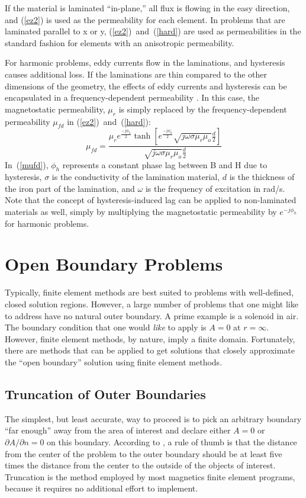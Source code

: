 \documentclass[12pt]{report}
\newcommand{\be}{\begin{equation}}
\newcommand{\ee}{\end{equation}}
\begin{document}
If the material is laminated ``in-plane,'' all flux is flowing in
the easy direction, and (\ref{ez2}) is used as the permeability for
each element.  In problems that are laminated parallel to x or y,
(\ref{ez2})~and~(\ref{hard}) are used as permeabilities in the
standard fashion for elements with an anisotropic permeability.

For harmonic problems, eddy currents flow in the laminations, and
hysteresis causes additional loss.  If the laminations are thin
compared to the other dimensions of the geometry, the effects of
eddy currents and hysteresis can be encapsulated in a
frequency-dependent permeability \cite{stoll}.  In this case, the
magnetostatic permeability, $\mu_r$ is simply replaced by the
frequency-dependent permeability $\mu_{fd}$ in
(\ref{ez2})~and~(\ref{hard}):
\be \label{mufd}
\mu_{fd} = \frac{\mu_r e^{\frac{-j \phi_h}{2}} \tanh \left[ e^{\frac{-j \phi_h}{2}}
\sqrt{j \omega \sigma \mu_r \mu_o} \frac{d}{2} \right]}
{\sqrt{j \omega \sigma \mu_r \mu_o} \frac{d}{2}} \ee
 In~(\ref{mufd}), $\phi_h$ represents a constant phase lag between
B and H due to hysteresis, $\sigma$ is the conductivity of the
lamination material, $d$ is the thickness of the iron part of the
lamination, and $\omega$ is the frequency of excitation in rad/s.
Note that the concept of hysteresis-induced lag can be applied to
non-laminated materials as well, simply by multiplying the
magnetostatic permeability by $e^{-j \phi_h}$ for harmonic
problems.

\section{Open Boundary Problems} \label{open_boundary}

Typically, finite element methods are best suited to problems with
well-defined, closed solution regions.  However, a large number of
problems that one might like to address have no natural outer
boundary.  A prime example is a solenoid in air.  The boundary
condition that one would {\em like} to apply is $A=0$ at
$r=\infty$.  However, finite element methods, by nature, imply a
finite domain.  Fortunately, there are methods that can be applied
to get solutions that closely approximate the ``open boundary''
solution using finite element methods.

\subsection{Truncation of Outer Boundaries}
The simplest, but least accurate, way to proceed is to pick an
arbitrary boundary ``far enough'' away from the area of interest
and declare either $A=0$ or $\partial A/\partial n=0$ on this
boundary.  According to \cite{chen}, a rule of thumb is that the
distance from the center of the problem to the outer boundary
should be at least five times the distance from the center to the
outside of the objects of interest.  Truncation is the method
employed by most magnetics finite element programs, because it
requires no additional effort to implement.
\end{document}
